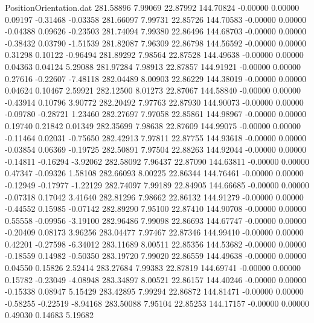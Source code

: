 \begin{filecontents}{PositionOrientation.dat}
 281.58896    7.99069   22.87992   144.70824   -0.00000    0.00000    0.09197   -0.31468   -0.03358
 281.66097    7.99731   22.85726   144.70583   -0.00000    0.00000   -0.04388    0.09626   -0.23503
 281.74094    7.99380   22.86496   144.68703   -0.00000    0.00000   -0.38432    0.03790   -1.51539
 281.82087    7.96309   22.86798   144.56592   -0.00000    0.00000    0.31298    0.10122   -0.96494
 281.89292    7.98564   22.87528   144.49638   -0.00000    0.00000    0.04363    0.04124    5.29088
 281.97284    7.98913   22.87857   144.91921   -0.00000    0.00000    0.27616   -0.22607   -7.48118
 282.04489    8.00903   22.86229   144.38019   -0.00000    0.00000    0.04624    0.10467    2.59921
 282.12500    8.01273   22.87067   144.58840   -0.00000    0.00000   -0.43914    0.10796    3.90772
 282.20492    7.97763   22.87930   144.90073   -0.00000    0.00000   -0.09780   -0.28721    1.23460
 282.27697    7.97058   22.85861   144.98967   -0.00000    0.00000    0.19740    0.21842    0.01349
 282.35699    7.98638   22.87609   144.99075   -0.00000    0.00000   -0.11464    0.02031   -0.75650
 282.42913    7.97811   22.87755   144.93618   -0.00000    0.00000   -0.03854    0.06369   -0.19725
 282.50891    7.97504   22.88263   144.92044   -0.00000    0.00000   -0.14811   -0.16294   -3.92062
 282.58092    7.96437   22.87090   144.63811   -0.00000    0.00000    0.47347   -0.09326    1.58108
 282.66093    8.00225   22.86344   144.76461   -0.00000    0.00000   -0.12949   -0.17977   -1.22129
 282.74097    7.99189   22.84905   144.66685   -0.00000    0.00000   -0.07318    0.17042    3.41640
 282.81296    7.98662   22.86132   144.91279   -0.00000    0.00000   -0.44552    0.15985   -0.07142
 282.89290    7.95100   22.87410   144.90708   -0.00000    0.00000    0.55558   -0.09956   -3.19100
 282.96486    7.99098   22.86693   144.67747   -0.00000    0.00000   -0.20409    0.08173    3.96256
 283.04477    7.97467   22.87346   144.99410   -0.00000    0.00000    0.42201   -0.27598   -6.34012
 283.11689    8.00511   22.85356   144.53682   -0.00000    0.00000   -0.18559    0.14982   -0.50350
 283.19720    7.99020   22.86559   144.49638   -0.00000    0.00000    0.04550    0.15826    2.52414
 283.27684    7.99383   22.87819   144.69741   -0.00000    0.00000    0.15782   -0.23049   -4.08948
 283.34897    8.00521   22.86157   144.40246   -0.00000    0.00000   -0.15338    0.08947    5.15429
 283.42895    7.99294   22.86872   144.81471   -0.00000    0.00000   -0.58255   -0.22519   -8.94168
 283.50088    7.95104   22.85253   144.17157   -0.00000    0.00000    0.49030    0.14683    5.19682

\end{filecontents}
